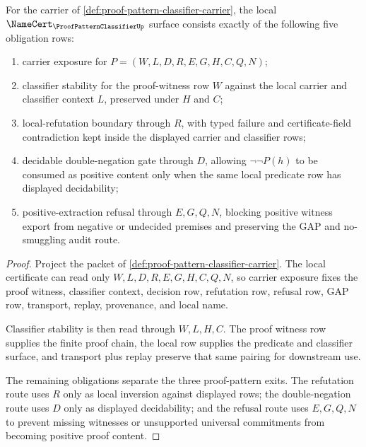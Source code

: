 \begin{theorem}
\label{thm:proof-pattern-classifier-namecert-obligations}
For the carrier of \autoref{def:proof-pattern-classifier-carrier}, the local $\NameCert_{\ProofPatternClassifierUp}$ surface consists exactly of the following five obligation rows:
\begin{enumerate}
\item carrier exposure for $P=(W,L,D,R,E,G,H,C,Q,N)$;
\item classifier stability for the proof-witness row $W$ against the local carrier and classifier context $L$, preserved under $H$ and $C$;
\item local-refutation boundary through $R$, with typed failure and certificate-field contradiction kept inside the displayed carrier and classifier rows;
\item decidable double-negation gate through $D$, allowing $\neg\neg P(h)$ to be consumed as positive content only when the same local predicate row has displayed decidability;
\item positive-extraction refusal through $E,G,Q,N$, blocking positive witness export from negative or undecided premises and preserving the GAP and no-smuggling audit route.
\end{enumerate}
\end{theorem}
\begin{proof}
Project the packet of \autoref{def:proof-pattern-classifier-carrier}. The local certificate can read only $W,L,D,R,E,G,H,C,Q,N$, so carrier exposure fixes the proof witness, classifier context, decision row, refutation row, refusal row, GAP row, transport, replay, provenance, and local name.

Classifier stability is then read through $W,L,H,C$. The proof witness row supplies the finite proof chain, the local row supplies the predicate and classifier surface, and transport plus replay preserve that same pairing for downstream use.

The remaining obligations separate the three proof-pattern exits. The refutation route uses $R$ only as local inversion against displayed rows; the double-negation route uses $D$ only as displayed decidability; and the refusal route uses $E,G,Q,N$ to prevent missing witnesses or unsupported universal commitments from becoming positive proof content.
\end{proof}

